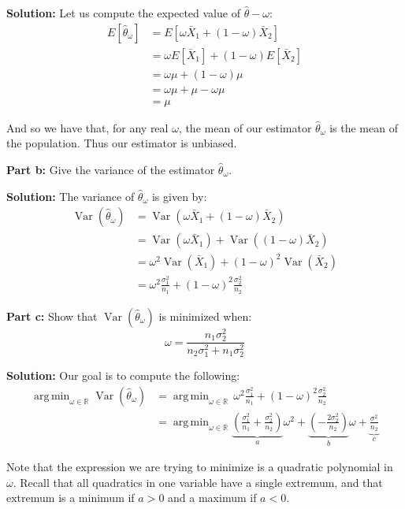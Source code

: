 \documentclass{article}
\DeclareMathOperator{\Var}{Var}
\DeclareMathOperator*{\argmin}{arg\,min}
\begin{document}
\noindent\textbf{Solution:} Let us compute the expected value of $\hat\theta-\omega$:
\begin{align*}
    E[\hat\theta_\omega]&=E[\omega\bar X_1+(1-\omega)\bar X_2]\tag{def. of $\hat\theta_\omega$}\\
    &=\omega E[\bar X_1]+(1-\omega)E[\bar X_2]\tag{linearity of expectation}\\
    &=\omega\mu+(1-\omega)\mu\tag{mean of sample mean}\\
    &=\omega\mu+\mu-\omega\mu\\
    &=\mu
\end{align*}

And so we have that, for any real $\omega$, the mean of our estimator $\hat\theta_\omega$ is the mean of the population. Thus our estimator is unbiased.
\bigskip

\noindent\textbf{Part b:} Give the variance of the estimator $\hat\theta_\omega$.
\bigskip

\noindent\textbf{Solution:} The variance of $\hat\theta_\omega$ is given by:
\begin{align*}
    \Var(\hat\theta_\omega)&=\Var(\omega\bar X_1+(1-\omega)\bar X_2)\tag{def. of $\hat\theta_\omega$}\\
    &=\Var(\omega\bar X_1)+\Var((1-\omega)\bar X_2)\tag{variance of independent RVs}\\
    &=\omega^2\Var(\bar X_1)+(1-\omega)^2\Var(\bar X_2)\tag{variance of multiple of RV}\\
    &=\omega^2\frac{\sigma^2_1}{n_1}+(1-\omega)^2\frac{\sigma^2_2}{n_2}\tag{variance of sample mean}
\end{align*}
\smallskip

\noindent\textbf{Part c:} Show that $\Var(\hat\theta_\omega)$ is minimized when:
$$\omega=\frac{n_1\sigma^2_2}{n_2\sigma^2_1+n_1\sigma^2_2}$$
\bigskip

\noindent\textbf{Solution:} Our goal is to compute the following:
\begin{align*}
    \argmin_{\omega\in\mathbb R}\Var(\hat\theta_\omega)&=\argmin_{\omega\in\mathbb R}\,\omega^2\frac{\sigma^2_1}{n_1}+(1-\omega)^2\frac{\sigma^2_2}{n_2}\tag{part b}\\
    &=\argmin_{\omega\in\mathbb R}\underbrace{\left(\frac{\sigma^2_1}{n_1}+\frac{\sigma^2_2}{n_2}\right)}_{a}\omega^2+\underbrace{\left(-\frac{2\sigma^2_2}{n_2}\right)}_{b}\omega+\underbrace{\frac{\sigma^2}{n_2}}_{c}
\end{align*}

Note that the expression we are trying to minimize is a quadratic polynomial in $\omega$. Recall that all quadratics in one variable have a single extremum, and that extremum is a minimum if $a>0$ and a maximum if $a<0$.
\end{document}
